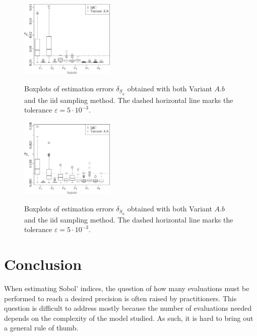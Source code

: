 \begin{figure}[t]
\caption{Boxplots of estimation errors $\delta_{\underline{S}_u}$ obtained with both Variant $A.b$ and the iid sampling method. The dashed horizontal line marks the tolerance $\varepsilon=5\cdot 10^{-3}$.}
\centering
\vspace*{0.2cm}
\includegraphics[width=0.4\textwidth]{comp_mc_first.eps}
\label{compa_MC_first}
\end{figure}

\begin{figure}[t]
\caption{Boxplots of estimation errors $\delta_{\overline{S}_u}$ obtained with both Variant $A.b$ and the iid sampling method. The dashed horizontal line marks the tolerance $\varepsilon=5\cdot 10^{-3}$.}
\centering
\vspace*{0.2cm}
\includegraphics[width=0.4\textwidth]{comp_mc_tot.eps}
\label{compa_MC_tot}
\end{figure}


\section{Conclusion}
When estimating Sobol' indices, the question of how many evaluations must be performed to reach a desired precision is often raised by practitioners. This question is difficult to address mostly because the number of evaluations needed depends on the complexity of the model studied. As such, it is hard to bring out a general rule of thumb. 

